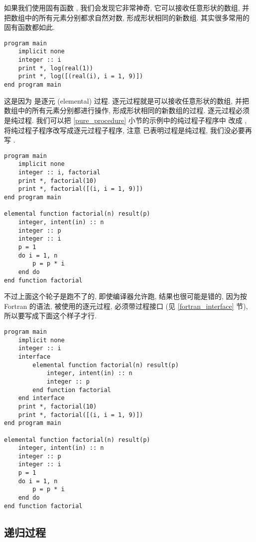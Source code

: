 如果我们使用固有函数 , 我们会发现它非常神奇, 它可以接收任意形状的数组, 并把数组中的所有元素分别都求自然对数, 形成形状相同的新数组. 其实很多常用的固有函数都如此.
\begin{lstlisting}
program main
    implicit none
    integer :: i
    print *, log(real(1))
    print *, log([(real(i), i = 1, 9)])
end program main
\end{lstlisting}
这是因为  是逐元 (elemental) 过程. 逐元过程就是可以接收任意形状的数组, 并把数组中的所有元素分别都进行操作, 形成形状相同的新数组的过程. 逐元过程必须是纯过程. 我们可以把 \ref{pure_procedure} 小节的示例中的纯过程子程序中  改成 , 将纯过程子程序改写成逐元过程子程序, 注意  已表明过程是纯过程, 我们没必要再写 .
\begin{lstlisting}
program main
    implicit none
    integer :: i, factorial
    print *, factorial(10)
    print *, factorial([(i, i = 1, 9)])
end program main

elemental function factorial(n) result(p)
    integer, intent(in) :: n
    integer :: p
    integer :: i 
    p = 1
    do i = 1, n
        p = p * i
    end do
end function factorial
\end{lstlisting}
不过上面这个轮子是跑不了的, 即使编译器允许跑, 结果也很可能是错的, 因为按 Fortran 的语法, 被使用的逐元过程, 必须带过程接口 (见 \ref{fortran_interface} 节), 所以要写成下面这个样子才行.\label{elemental_procedure_program} 
\begin{lstlisting}
program main
    implicit none
    integer :: i
    interface
        elemental function factorial(n) result(p)
            integer, intent(in) :: n
            integer :: p
        end function factorial
    end interface
    print *, factorial(10)
    print *, factorial([(i, i = 1, 9)])
end program main

elemental function factorial(n) result(p)
    integer, intent(in) :: n
    integer :: p
    integer :: i 
    p = 1
    do i = 1, n
        p = p * i
    end do
end function factorial
\end{lstlisting}

\subsection{递归过程}

